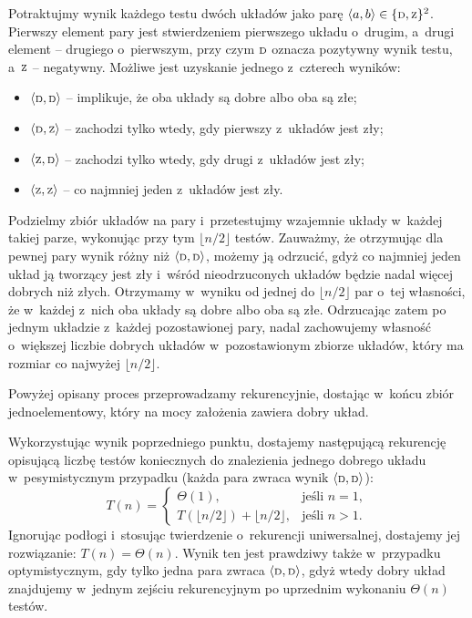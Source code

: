 \subproblem %
Potraktujmy wynik każdego testu dwóch układów jako parę $\langle a,b\rangle\in\{{\scriptstyle\rm D},{\scriptstyle\rm Z}\}^2$. Pierwszy element pary jest stwierdzeniem pierwszego układu o~drugim, a~drugi element -- drugiego o~pierwszym, przy czym ${\scriptstyle\rm D}$ oznacza pozytywny wynik testu, a~${\scriptstyle\rm Z}$ -- negatywny. Możliwe jest uzyskanie jednego z~czterech wyników:
\begin{itemize}
	\item $\langle{\scriptstyle\rm D},{\scriptstyle\rm D}\rangle$ -- implikuje, że oba układy są dobre albo oba są złe;
	\item $\langle{\scriptstyle\rm D},{\scriptstyle\rm Z}\rangle$ -- zachodzi tylko wtedy, gdy pierwszy z~układów jest zły;
	\item $\langle{\scriptstyle\rm Z},{\scriptstyle\rm D}\rangle$ -- zachodzi tylko wtedy, gdy drugi z~układów jest zły;
	\item $\langle{\scriptstyle\rm Z},{\scriptstyle\rm Z}\rangle$ -- co najmniej jeden z~układów jest zły.
\end{itemize}

Podzielmy zbiór układów na pary i~przetestujmy wzajemnie układy w~każdej takiej parze, wykonując przy tym $\lfloor n/2\rfloor$ testów. Zauważmy, że otrzymując dla pewnej pary wynik różny niż $\langle{\scriptstyle\rm D},{\scriptstyle\rm D}\rangle$, możemy ją odrzucić, gdyż co najmniej jeden układ ją tworzący jest zły i~wśród nieodrzuconych układów będzie nadal więcej dobrych niż złych. Otrzymamy w~wyniku od jednej do $\lfloor n/2\rfloor$ par o~tej własności, że w~każdej z~nich oba układy są dobre albo oba są złe. Odrzucając zatem po jednym układzie z~każdej pozostawionej pary, nadal zachowujemy własność o~większej liczbie dobrych układów w~pozostawionym zbiorze układów, który ma rozmiar co najwyżej $\lfloor n/2\rfloor$.

Powyżej opisany proces przeprowadzamy rekurencyjnie, dostając w~końcu zbiór jednoelementowy, który na mocy założenia zawiera dobry układ.

\subproblem %
Wykorzystując wynik poprzedniego punktu, dostajemy następującą rekurencję opisującą liczbę testów koniecznych do znalezienia jednego dobrego układu w~pesymistycznym przypadku (każda para zwraca wynik $\langle{\scriptstyle\rm D},{\scriptstyle\rm D}\rangle$):
\[
	T(n) =
	\begin{cases}
		\Theta(1), & \text{jeśli $n=1$}, \\
		T(\lfloor n/2\rfloor)+\lfloor n/2\rfloor, & \text{jeśli $n>1$}.
	\end{cases}
\]
Ignorując podłogi i~stosując twierdzenie o~rekurencji uniwersalnej, dostajemy jej rozwiązanie: $T(n)=\Theta(n)$. Wynik ten jest prawdziwy także w~przypadku optymistycznym, gdy tylko jedna para zwraca $\langle{\scriptstyle\rm D},{\scriptstyle\rm D}\rangle$, gdyż wtedy dobry układ znajdujemy w~jednym zejściu rekurencyjnym po uprzednim wykonaniu $\Theta(n)$ testów.

